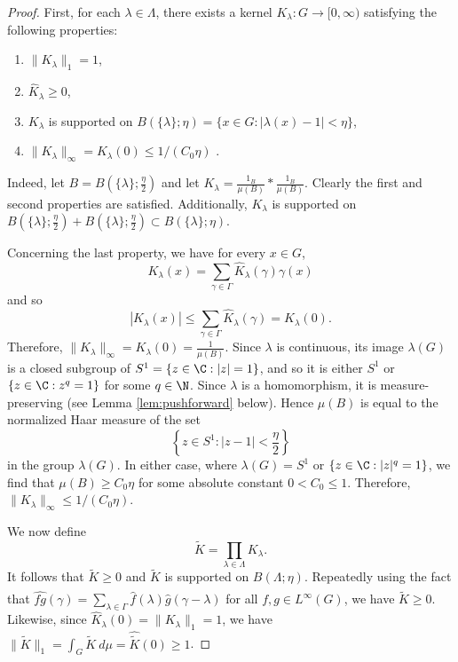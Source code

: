 \begin{proof}
    First, for each $\lambda \in \Lambda$, there exists a kernel $K_{\lambda}: G \to [0, \infty)$ satisfying the following properties:
\begin{enumerate}
\item $\lVert K_{\lambda} \rVert_1 = 1$,
\item $\widehat{K}_{\lambda} \geq 0$,
\item $K_{\lambda}$ is supported on $B(\{\lambda\}; \eta) = \{x \in G: |\lambda(x) - 1| < \eta\}$,
\item $\|K_\lambda\|_{\infty} = K_{\lambda}(0) \leq 1/(C_0 \eta)$ .
\end{enumerate}		
Indeed, let $B = B(\{\lambda\}; \frac{\eta}{2})$ and let $K_{\lambda} = \frac{1_B}{\mu(B)}*\frac{1_B}{\mu(B)}$. Clearly the first and second properties are satisfied. Additionally, $K_{\lambda}$ is supported on $B(\{\lambda\}; \frac{\eta}{2}) + B(\{\lambda\}; \frac{\eta}{2}) \subset B(\{\lambda\}; \eta)$. 

Concerning the last property, we have for every $x \in G$,
\[
    K_{\lambda}(x) = \sum_{\gamma \in \Gamma} \widehat{K}_{\lambda}(\gamma) \gamma(x)
\]
and so
\[
    \left| K_{\lambda}(x) \right| \leq \sum_{\gamma \in \Gamma} \widehat{K}_{\lambda}(\gamma) = K_{\lambda}(0).
\]
Therefore, $\lVert K_{\lambda} \rVert_{\infty} = K_{\lambda}(0) = \frac{1}{\mu(B)}$.
Since $\lambda$ is continuous, its image $\lambda(G)$ is a closed subgroup of $S^1 = \{ z \in \C: |z|=1\}$, and so it is either $S^1$ or $\{ z \in \C : z^q=1\}$ for some $q \in \N$. Since $\lambda$ is a homomorphism, it is measure-preserving (see Lemma \ref{lem:pushforward} below). Hence $\mu(B)$ is equal to the normalized Haar measure of the set
\[
\left\{ z \in S^1 : |z-1| < \frac{\eta}{2} \right\}
\]
in the group $\lambda(G)$. In either case, where $\lambda(G)=S^1$ or $\{ z \in \C : |z|^q=1\}$, we find that $\mu(B) \geq C_0 \eta$ for some absolute constant $0 < C_0 \leq 1$. Therefore, $\lVert K_{\lambda} \rVert_{\infty} \leq 1/(C_0 \eta)$.  
	
We now define
    \[
        \widetilde{K} = \prod_{\lambda \in \Lambda} K_{\lambda}.
    \]
    It follows that $\widetilde{K} \geq 0$ and $\widetilde{K}$ is supported on $B(\Lambda; \eta)$. Repeatedly using the fact that $\widehat{fg}(\gamma) = \sum_{\lambda \in \Gamma} \widehat{f}(\lambda) \widehat{g}(\gamma - \lambda)$ for all $f, g \in L^{\infty}(G)$, we have $\widehat{\widetilde{K}} \geq 0$. Likewise, since $\widehat{K}_{\lambda}(0) = \lVert K_{\lambda} \rVert_1 = 1$, we have $\lVert \widetilde{K} \rVert_1 = \int_G \widetilde{K} \ d \mu =  \widehat{\widetilde{K}}(0) \geq 1$.
    

\end{proof}
